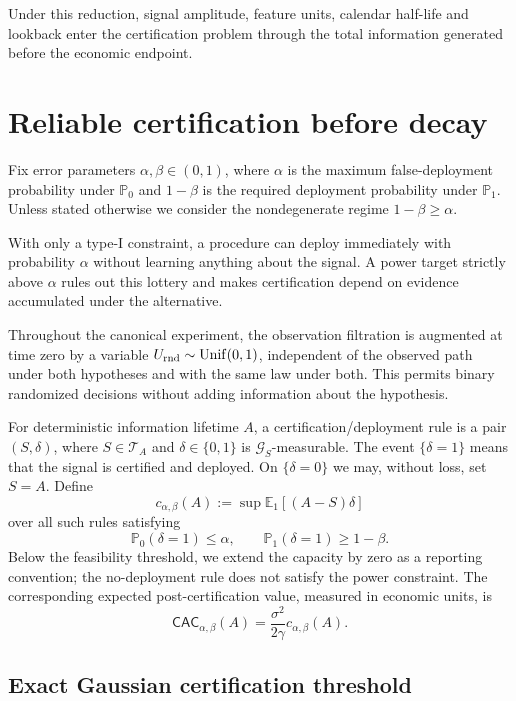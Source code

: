 \documentclass[11pt]{article}
\numberwithin{equation}{section}
\theoremstyle{plain}
\theoremstyle{definition}
\theoremstyle{remark}
\newcommand{\Pzero}{\mathbb P_0}
\newcommand{\Pone}{\mathbb P_1}
\newcommand{\Eone}{\mathbb E_1}
\begin{document}
Under this reduction, signal amplitude, feature units, calendar half-life and lookback enter the certification problem through the total information generated before the economic endpoint.

\section{Reliable certification before decay}\label{reliable-deployment-and-certified-alpha-capacity}

Fix error parameters $\alpha,\beta\in(0,1)$, where $\alpha$ is the maximum
false-deployment probability under $\Pzero$ and $1-\beta$ is the required
deployment probability under $\Pone$.  Unless stated otherwise we consider the
nondegenerate regime $1-\beta\ge\alpha$.

With only a type-I constraint, a procedure can deploy immediately with
probability \(\alpha\) without learning anything about the signal. A power target strictly above $\alpha$ rules out this lottery and makes certification depend on evidence
accumulated under the alternative.

Throughout the canonical experiment, the observation filtration is augmented at time zero by a variable $U_{\rm rnd}\sim\mathrm{Unif}(0,1)$, independent of the observed path under both hypotheses and with the same law under both. This permits binary randomized decisions without adding information about the hypothesis.

For deterministic information lifetime \(A\), a certification/deployment rule is a pair \((S,\delta)\), where \(S\in\mathcal T_A\) and \(\delta\in\{0,1\}\) is \(\mathcal G_S\)-measurable. The event \(\{\delta=1\}\) means that the signal is certified and deployed. On \(\{\delta=0\}\) we may, without loss, set \(S=A\). Define
\[
c_{\alpha,\beta}(A)
:=\sup \Eone[(A-S)\delta]
\]
over all such rules satisfying
\[
\Pzero(\delta=1)\le\alpha,
\qquad
\Pone(\delta=1)\ge1-\beta.
\] Below the feasibility threshold, we extend the capacity by zero as a reporting convention; the no-deployment rule does not satisfy the power constraint. The corresponding expected post-certification value, measured in economic units, is \[
\mathsf{CAC}_{\alpha,\beta}(A)
=\frac{\sigma^2}{2\gamma}c_{\alpha,\beta}(A).
\]

\subsection{Exact Gaussian certification threshold}\label{exact-reliable-information-phase-transition}
\end{document}
